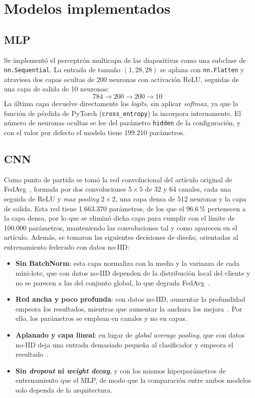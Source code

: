 \section{Modelos implementados}

\subsection{MLP}
Se implementó el perceptrón multicapa de las diapositivas como una subclase de \texttt{nn.Sequential}. La entrada
de tamaño $(1, 28, 28)$ se aplana con \texttt{nn.Flatten} y atraviesa dos capas ocultas de 200 neuronas con activación
ReLU, seguidas de una capa de salida de 10 neuronas:
\[
784 \rightarrow 200 \rightarrow 200 \rightarrow 10
\]
La última capa devuelve directamente los \textit{logits}, sin aplicar \textit{softmax}, ya que la función de pérdida
de PyTorch (\texttt{cross\_entropy}) la incorpora internamente. El número de neuronas ocultas se lee del parámetro
\texttt{hidden} de la configuración, y con el valor por defecto el modelo tiene 199.210 parámetros.

\subsection{CNN}
Como punto de partida se tomó la red convolucional del artículo original de FedAvg~\cite{mcmahan}, formada por dos
convoluciones $5 \times 5$ de 32 y 64 canales, cada una seguida de ReLU y \textit{max pooling} $2 \times 2$, una
capa densa de 512 neuronas y la capa de salida. Esta red tiene 1.663.370 parámetros, de los que el 96.6\,\%
pertenecen a la capa densa, por lo que se eliminó dicha capa para cumplir con el límite de 100.000 parámetros,
manteniendo las convoluciones tal y como aparecen en el artículo. Además, se tomaron las siguientes decisiones de
diseño, orientadas al entrenamiento federado con datos no-IID:

\begin{itemize}
    \item \textbf{Sin BatchNorm}: esta capa normaliza con la media y la varianza de cada mini-lote, que con datos
    no-IID dependen de la distribución local del cliente y no se parecen a las del conjunto global, lo que degrada
    FedAvg~\cite{hsieh}.
    \item \textbf{Red ancha y poco profunda}: con datos no-IID, aumentar la profundidad empeora los resultados,
    mientras que aumentar la anchura los mejora~\cite{divergencia}. Por ello, los parámetros se emplean en canales
    y no en capas.
    \item \textbf{Aplanado y capa lineal}: en lugar de \textit{global average pooling}, que con datos no-IID deja
    una entrada demasiado pequeña al clasificador y empeora el resultado~\cite{divergencia}.
    \item \textbf{Sin \textit{dropout} ni \textit{weight decay}}, y con los mismos hiperparámetros de entrenamiento
    que el MLP, de modo que la comparación entre ambos modelos solo dependa de la arquitectura.
\end{itemize}

